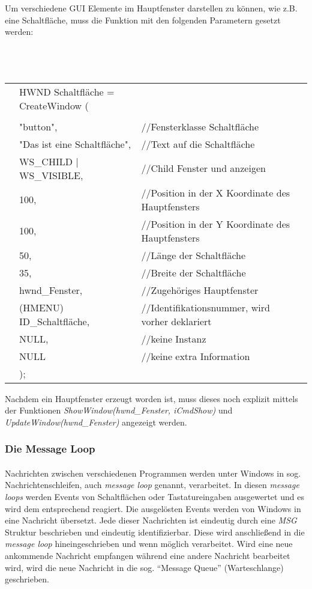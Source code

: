                        
Um verschiedene GUI Elemente im Hauptfenster darstellen zu können, wie z.B. eine Schaltfläche, muss die Funktion mit den folgenden Parametern gesetzt werden:\\\\\\\\

\begin{tabular}{llll}
& HWND Schaltfläche = CreateWindow (\\
\\
& "button",					& //Fensterklasse Schaltfläche\\
& "Das ist eine Schaltfläche",		& //Text auf die Schaltfläche\\
& WS\_CHILD | WS\_VISIBLE,	& //Child Fenster und anzeigen\\
& 100,						& //Position in der X Koordinate des Hauptfensters\\
& 100,						& //Position in der Y Koordinate des Hauptfensters\\
& 50,						& //Länge der Schaltfläche\\
& 35,						& //Breite der Schaltfläche\\
& hwnd\_Fenster,				& //Zugehöriges Hauptfenster\\
& (HMENU) ID\_Schaltfläche,			& //Identifikationsnummer, wird vorher deklariert\\
& NULL,						& //keine Instanz\\
& NULL						& //keine extra Information\\
& );
\end{tabular}

Nachdem ein Hauptfenster erzeugt worden ist, muss dieses noch explizit mittels der Funktionen \textit{ShowWindow(hwnd\_Fenster, iCmdShow)} und \textit{UpdateWindow(hwnd\_Fenster)}	angezeigt werden.

\subsubsection{Die Message Loop}\label{message-loop}
\paragraph{}
Nachrichten zwischen verschiedenen Programmen werden unter Windows in sog. Nachrichtenschleifen, auch \textit{message loop} genannt, verarbeitet. In diesen \textit{message loops}  werden Events von Schaltflächen oder Tastatureingaben ausgewertet und es wird dem entsprechend reagiert. Die ausgelösten Events werden von Windows in eine Nachricht übersetzt. Jede dieser Nachrichten ist eindeutig durch eine \textit{MSG} Struktur beschrieben und eindeutig identifizierbar. Diese wird anschließend in die \textit{message loop} hineingeschrieben und wenn möglich verarbeitet. Wird eine neue ankommende Nachricht empfangen während eine andere Nachricht bearbeitet wird, wird die neue Nachricht in die sog. "`Message Queue"' (Warteschlange) geschrieben. 

